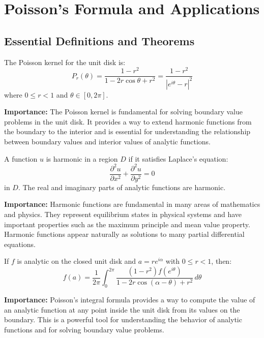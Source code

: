 \section{Poisson's Formula and Applications}

\subsection*{Essential Definitions and Theorems}

\begin{definition}
The Poisson kernel for the unit disk is:
\[P_r(\theta) = \frac{1-r^2}{1-2r\cos\theta + r^2} = \frac{1-r^2}{|e^{i\theta}-r|^2}\]
where $0 \leq r < 1$ and $\theta \in [0, 2\pi]$.
\end{definition}

\noindent\textbf{Importance:} The Poisson kernel is fundamental for solving boundary value problems in the unit disk. It provides a way to extend harmonic functions from the boundary to the interior and is essential for understanding the relationship between boundary values and interior values of analytic functions.



\begin{definition}
A function $u$ is harmonic in a region $D$ if it satisfies Laplace's equation:
\[\frac{\partial^2 u}{\partial x^2} + \frac{\partial^2 u}{\partial y^2} = 0\]
in $D$. The real and imaginary parts of analytic functions are harmonic.
\end{definition}

\noindent\textbf{Importance:} Harmonic functions are fundamental in many areas of mathematics and physics. They represent equilibrium states in physical systems and have important properties such as the maximum principle and mean value property. Harmonic functions appear naturally as solutions to many partial differential equations.



\begin{theorem}
If $f$ is analytic on the closed unit disk and $a = re^{i\alpha}$ with $0 \leq r < 1$, then:
\[f(a) = \frac{1}{2\pi} \int_0^{2\pi} \frac{(1-r^2)f(e^{i\theta})}{1-2r\cos(\alpha-\theta) + r^2} \, d\theta\]
\end{theorem}

\noindent\textbf{Importance:} Poisson's integral formula provides a way to compute the value of an analytic function at any point inside the unit disk from its values on the boundary. This is a powerful tool for understanding the behavior of analytic functions and for solving boundary value problems.



